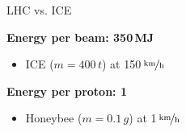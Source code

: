 \begin{frame}{LHC vs. ICE}
\begin{spacing}{2}
       \textbf{Energy per beam: 350\,MJ } \\
   \begin{itemize}
       \item[\ding{43}] ICE ($m=400\,t$) at 150\,$\nicefrac{\text{km}}{\text{h}}$ \\ 
   \end{itemize}

     \textbf{Energy per proton: 1\, } \\
   \begin{itemize}
       \item[\ding{43}] Honeybee ($m=0.1\,g$) at 1\,$\nicefrac{\text{km}}{\text{h}}$ 
   \end{itemize}
   
\end{spacing}

   
    
\end{frame}
